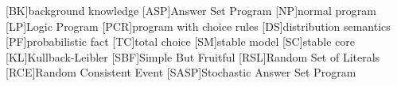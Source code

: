 \newcommand{\tcgen}[1]{\MODELset\at{#1}}
\newcommand{\condsymb}[2]{\ensuremath{p_{#1|#2}}}
\newcommand{\lpmln}{\texttt{LP\textsuperscript{MLN}}}
\newcommand{\emptyevent}{\ensuremath{\lambda}}
\newcommand{\powerset}[1]{\ensuremath{\mathbb{P}\at{#1}}}
%
%
[BK]{background knowledge}
[ASP]{Answer Set Program}
[NP]{normal program}
[LP]{Logic Program}
[PCR]{program with choice rules}
[DS]{distribution semantics}
[PF]{probabilistic fact}
[TC]{total choice}
[SM]{stable model}
[SC]{stable core}
[KL]{Kullback-Leibler}
[SBF]{Simple But Fruitful}
[RSL]{Random Set of Literals}
[RCE]{Random Consistent Event}
[SASP]{Stochastic Answer Set Program}
%
%
\newcommand{\LOOK}{\ensuremath{\blacksquare}}
\newcommand{\delete}[1]{\sout{#1}}
\newcommand{\replace}[2]{\delete{#1}{#2}}
\newcommand{\bruno}{\color{red!60!black}}
\newcommand{\dietmar}[1]{{\color{brown!40!black}#1}}


\newcommand{\selfnote}[1]{\todo[backgroundcolor=green!20]{{\footnotesize #1}}}
\newcommand{\spa}[1]{{\todo[size=footnotesize,color=teal!20]{\textbf{SPA:} #1}}}
\newcommand{\dsnote}[1]{{\todo[size=footnotesize,color=teal!20]{\textbf{DS:} #1}}}
\newcommand{\franc}[1]{{\todo[size=footnotesize,color=green!30]{\textbf{FC:} #1}}}
\newcommand{\bdnote}[1]{{\todo[size=footnotesize,color=red!60]{\textbf{BD:} #1}}}
